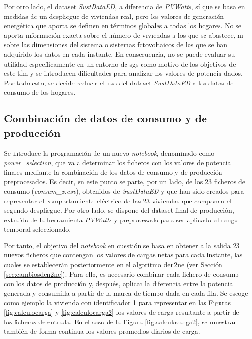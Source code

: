 \vspace{3mm}

Por otro lado, el dataset \textit{SustDataED}, a diferencia de \textit{PVWatts}, sí que se basa en medidas de un despliegue de viviendas real, pero los valores de generación energética que aporta se definen en términos globales a todas los hogares. No se aporta información exacta sobre el número de viviendas a los que se abastece, ni sobre las dimensiones del sistema o sistemas fotovoltaicos de los que se han adquirido los datos en cada instante. En consecuencia, no se puede evaluar su utilidad específicamente en un entorno de \gls{sg}s como motivo de los objetivos de este \gls{tfm} y se introducen dificultades para analizar los valores de potencia dados. Por todo esto, se decide reducir el uso del dataset \textit{SustDataED} a los datos de consumo de los hogares.

\subsection{Combinación de datos de consumo y de producción}
\label{sec:combinacion}

Se introduce la programación de un nuevo \textit{notebook}, denominado como \textit{power\_selection}, que va a determinar los ficheros con los valores de potencia finales mediante la combinación de los datos de consumo y de producción preprocesados. Es decir, en este punto se parte, por un lado, de los 23 ficheros de consumo (\textit{consum\_x.csv}), obtenidos de \textit{SustDataED} y que han sido creados para representar el comportamiento eléctrico de las 23 viviendas que componen el segundo despliegue. Por otro lado, se dispone del dataset final de producción, extraído de la herramienta \textit{PVWatts} y preprocesado para ser aplicado al rango temporal seleccionado. 

\vspace{3mm}

Por tanto, el objetivo del \textit{notebook} en cuestión se basa en obtener a la salida 23 nuevos ficheros que contengan los valores de cargas netas para cada instante, las cuales se establecerán posteriormente en el algoritmo \gls{den2ne} (ver Sección \ref{sec:cambiosden2ne}). Para ello, es necesario combinar cada fichero de consumo con los datos de producción y, después, aplicar la diferencia entre la potencia generada y consumida a partir de la marca de tiempo dada en cada fila. Se escoge como ejemplo la vivienda con identificador 1 para representar en las Figuras \ref{fig:calculocarga} y \ref{fig:calculocarga2} los valores de carga resultante a partir de los ficheros de entrada. En el caso de la Figura \ref{fig:calculocarga2}, se muestran también de forma continua los valores promedios diarios de carga. 

